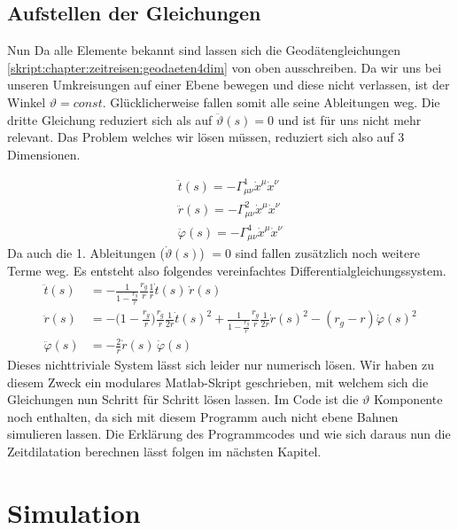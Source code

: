 \begin{refsection}
	\subsection{Aufstellen der Gleichungen}
	
	Nun Da alle Elemente bekannt sind lassen sich die Geodätengleichungen \eqref{skript:chapter:zeitreisen:geodaeten4dim} von oben ausschreiben. Da wir uns bei unseren Umkreisungen auf einer Ebene bewegen und diese nicht verlassen, ist der Winkel $\vartheta = const$. Glücklicherweise fallen somit alle seine Ableitungen weg. Die dritte Gleichung reduziert sich als auf $\ddot{\vartheta}(s)=0$ und ist für uns nicht mehr relevant. Das Problem welches wir lösen müssen, reduziert sich also auf 3 Dimensionen. 
	
	\begin{align*}
	\ddot{t}(s) = -\Gamma^{1}_{\mu\nu}\dot{x}^{\mu}\dot{x}^{\nu}\\
	\ddot{r}(s) = -\Gamma^{2}_{\mu\nu}\dot{x}^{\mu}\dot{x}^{\nu}\\
	\ddot{\varphi}(s) = -\Gamma^{4}_{\mu\nu}\dot{x}^{\mu}\dot{x}^{\nu}		
	\end{align*}
	Da auch die 1. Ableitungen ($\dot{\vartheta}(s)$) $= 0$ sind fallen zusätzlich noch weitere Terme weg. Es entsteht also folgendes vereinfachtes Differentialgleichungssystem.
	\begin{equation}
	\begin{aligned}
	\ddot t(s)
	&=
	-\frac{1}{1-\displaystyle\frac{r_g}{r}}\frac{r_g}{r}\frac{1}{r}\dot t(s)\,\dot r(s)
	\\
	\ddot r(s)
	&=
	-\biggl(1-\frac{r_g}{r}\biggr)\frac{r_g}{r}\frac1{2r}\dot t(s)^2
	+\frac{1}{1-\displaystyle\frac{r_g}{r}} \frac{r_g}{r}\frac1{2r}\dot r(s)^2
	- (r_g-r) \dot\varphi(s)^2
	\\
	\ddot \varphi(s)
	&=
	-\frac2r \dot r(s)\,\dot\varphi(s)
	\end{aligned}
	\end{equation}\label{finaleq}
	Dieses nichttriviale System lässt sich leider nur numerisch lösen. Wir haben zu diesem Zweck ein modulares Matlab-Skript geschrieben, mit welchem sich die Gleichungen nun Schritt für Schritt lösen lassen. Im Code ist die $\vartheta$ Komponente noch enthalten, da sich mit diesem Programm auch nicht ebene Bahnen simulieren lassen. Die Erklärung des Programmcodes und wie sich daraus nun die Zeitdilatation berechnen lässt folgen im nächsten Kapitel.
		
	\section{Simulation}
	

\end{refsection}
